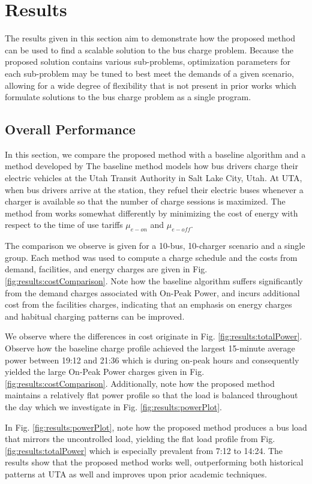 \section{Results}
The results given in this section aim to demonstrate how the proposed method can be used to find a scalable solution to the bus charge problem. Because the proposed solution contains various sub-problems, optimization parameters for each sub-problem may be tuned to best meet the demands of a given scenario, allowing for a wide degree of flexibility that is not present in prior works which formulate solutions to the bus charge problem as a single program.
\subsection{Overall Performance}
In this section, we compare the proposed method with a baseline algorithm and a method developed by \cite{he_battery_2022} The baseline method models how bus drivers charge their electric vehicles at the Utah Transit Authority in Salt Lake City, Utah. At UTA, when bus drivers arrive at the station, they refuel their electric buses whenever a charger is available so that the number of charge sessions is maximized. The method from \cite{he_battery_2022} works somewhat differently by minimizing the cost of energy with respect to the time of use tariffs $\mu_{e-on}$ and $\mu_{e-off}$.
\par The comparison we observe is given for a 10-bus, 10-charger scenario and a single group. Each method was used to compute a charge schedule and the costs from demand, facilities, and energy charges are given in Fig. \ref{fig:results:costComparison}. Note how the baseline algorithm suffers significantly from the demand charges associated with On-Peak Power, and \cite{he_battery_2022} incurs additional cost from the facilities charges, indicating that an emphasis on energy charges and habitual charging patterns can be improved.
\par We observe where the differences in cost originate in Fig. \ref{fig:results:totalPower}. Observe how the baseline charge profile achieved the largest 15-minute average power between 19:12 and 21:36 which is during on-peak hours and consequently yielded the large On-Peak Power charges given in Fig. \ref{fig:results:costComparison}. Additionally, note how the proposed method maintains a relatively flat power profile so that the load is balanced throughout the day which we investigate in Fig. \ref{fig:results:powerPlot}.
\par In Fig. \ref{fig:results:powerPlot}, note how the proposed method produces a bus load that mirrors the uncontrolled load, yielding the flat load profile from Fig. \ref{fig:results:totalPower} which is especially prevalent from 7:12 to 14:24. The results show that the proposed method works well, outperforming both historical patterns at UTA as well and improves upon prior academic techniques.
 


